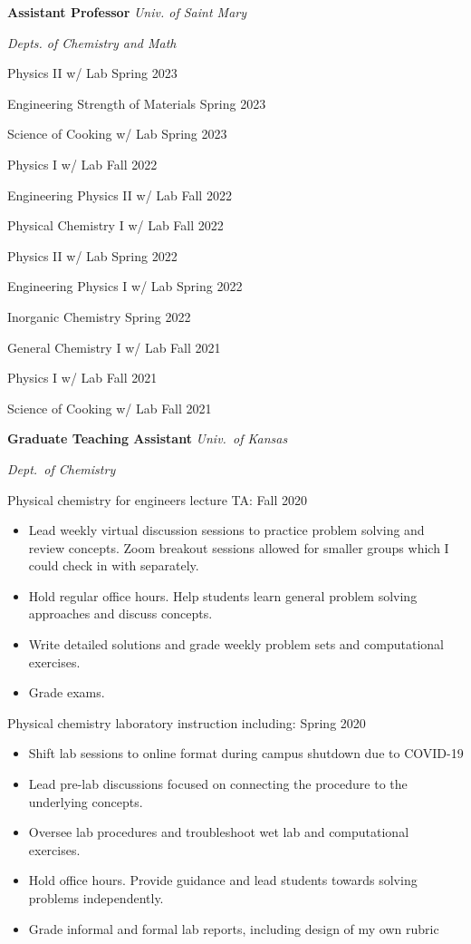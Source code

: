 
\textbf{Assistant Professor} \hfill \textit{Univ. of Saint Mary}

\hfill \textit{Depts. of Chemistry and Math}

Physics II w/ Lab \hfill Spring 2023

Engineering Strength of Materials \hfill Spring 2023

Science of Cooking w/ Lab \hfill Spring 2023

Physics I w/ Lab \hfill Fall 2022

Engineering Physics II w/ Lab \hfill Fall 2022

Physical Chemistry I w/ Lab \hfill Fall 2022

Physics II w/ Lab  \hfill Spring 2022

Engineering Physics I w/ Lab  \hfill Spring 2022

Inorganic Chemistry \hfill  \hfill Spring 2022

General Chemistry I w/ Lab  \hfill Fall 2021

Physics I w/ Lab \hfill Fall 2021

Science of Cooking w/ Lab \hfill Fall 2021

\vspace{\y}

{\bf Graduate Teaching Assistant} \hfill \textit{Univ.\ of Kansas}

\hfill \textit{Dept.\ of Chemistry}

Physical chemistry for engineers lecture TA: \hfill Fall 2020
\begin{itemize}[rightmargin=\dimexpr\linewidth-10cm-\leftmargin\relax,noitemsep,topsep=0cm]
\raggedright
  \item Lead weekly virtual discussion sessions to practice problem solving and review concepts. Zoom breakout sessions allowed for smaller groups which I could check in with separately.
  \item Hold regular office hours. Help students learn general problem solving approaches and discuss concepts.
  \item Write detailed solutions and grade weekly problem sets and computational exercises.
  \item Grade exams.
\end{itemize}

\vspace{\y}
Physical chemistry laboratory instruction including: \hfill Spring 2020
\begin{itemize}[rightmargin=\dimexpr\linewidth-10cm-\leftmargin\relax,noitemsep,topsep=0cm]
\raggedright
  \item Shift lab sessions to online format during campus shutdown due to COVID-19
  \item Lead pre-lab discussions focused on connecting the procedure to the underlying concepts.
  \item Oversee lab procedures and troubleshoot wet lab and computational
  exercises.
  \item Hold office hours. Provide guidance and lead students towards solving problems independently.
  \item Grade informal and formal lab reports, including design of my own rubric
\end{itemize}

